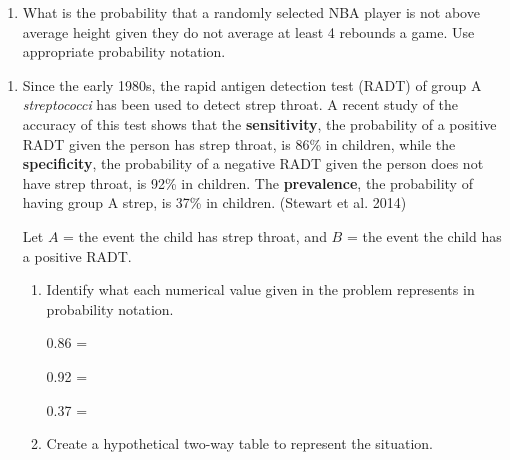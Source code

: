 \documentclass[
]{report}
\providecommand{\tightlist}{%
  \setlength{\itemsep}{0pt}\setlength{\parskip}{0pt}}
\begin{document}
\vspace{0.5in}

\begin{enumerate}
\def\labelenumi{\alph{enumi}.}
\setcounter{enumi}{2}
\tightlist
\item
  What is the probability that a randomly selected NBA player is not above average height given they do not average at least 4 rebounds a game. Use appropriate probability notation.
\end{enumerate}

\vspace{0.55in}

\newpage

\begin{enumerate}
\def\labelenumi{\arabic{enumi}.}
\setcounter{enumi}{1}
\item
  Since the early 1980s, the rapid antigen detection test (RADT) of group A \emph{streptococci} has been used to detect strep throat. A recent study of the accuracy of this test shows that the \textbf{sensitivity}, the probability of a positive RADT given the person has strep throat, is 86\% in children, while the \textbf{specificity}, the probability of a negative RADT given the person does not have strep throat, is 92\% in children. The \textbf{prevalence}, the probability of having group A strep, is 37\% in children. (Stewart et al. 2014)
  \vspace{1mm}

  Let \(A\) = the event the child has strep throat, and \(B\) = the event the child has a positive RADT.
  \vspace{0.1in}

  \begin{enumerate}
  \def\labelenumii{\alph{enumii}.}
  \item
    Identify what each numerical value given in the problem represents in probability notation.
    \vspace{.1in}

    0.86 =\\
    \vspace{.1in}

    0.92 =\\
    \vspace{.1in}

    0.37 =\\
    \vspace{.1in}
  \item
    Create a hypothetical two-way table to represent the situation.
  \end{enumerate}
\end{enumerate}
\end{document}
